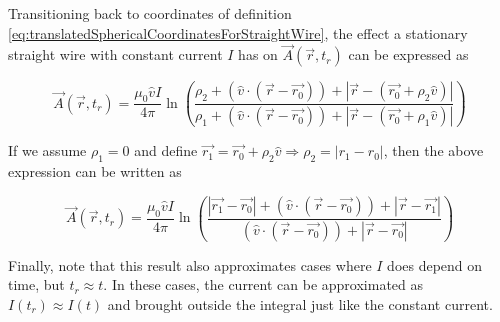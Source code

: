 ﻿\documentclass{article}
\begin{document}
Transitioning back to coordinates of definition \ref{eq:translatedSphericalCoordinatesForStraightWire}, the effect a stationary straight wire with constant current $I$ has on $\vec{A}(\vec{r}, t_r)$ can be expressed as

\begin{equation}
    \label{eq:effectOfStationaryStraightWireWithConstantCurrentOnA}
    \vec{A}(\vec{r}, t_r) = \frac{\mu_0 \hat{v} I}{4 \pi} \ln \left( \frac{\rho_2 + (\hat{v} \cdot (\vec{r} - \vec{r_0})) + |\vec{r} - (\vec{r_0} + \rho_2 \hat{v})|}{\rho_1 + (\hat{v} \cdot (\vec{r} - \vec{r_0})) + |\vec{r} - (\vec{r_0} + \rho_1 \hat{v})|} \right)
\end{equation}

If we assume $\rho_1 = 0$ and define $\vec{r_1} = \vec{r_0} + \rho_2 \hat{v} \Rightarrow \rho_2 = |r_1 - r_0|$, then the above expression can be written as

\begin{equation*}
    \vec{A}(\vec{r}, t_r) = \frac{\mu_0 \hat{v} I}{4 \pi} \ln \left( \frac{|\vec{r_1} - \vec{r_0}| + (\hat{v} \cdot (\vec{r} - \vec{r_0})) + |\vec{r} - \vec{r_1}|}{(\hat{v} \cdot (\vec{r} - \vec{r_0})) + |\vec{r} - \vec{r_0}|} \right)
\end{equation*}

Finally, note that this result also approximates cases where $I$ does depend on time, but $t_r \approx t$. In these cases, the current can be approximated as $I(t_r) \approx I(t)$ and brought outside the integral just like the constant current.
\end{document}
